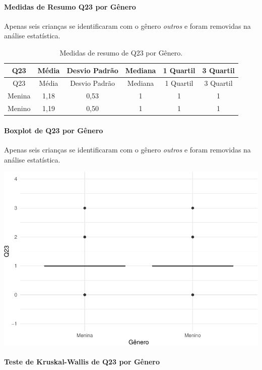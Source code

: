 \documentclass[]{article}
\let\oldparagraph\paragraph
\renewcommand{\paragraph}[1]{\oldparagraph{#1}\mbox{}}
\begin{document}
\hypertarget{medidas-de-resumo-q23-por-guxeanero}{%
\paragraph{Medidas de Resumo Q23 por Gênero}\label{medidas-de-resumo-q23-por-guxeanero}}

Apenas seis crianças se identificaram com o gênero \emph{outros} e foram removidas na análise estatística.

\begin{longtable}[]{@{}cccccc@{}}
\caption{\label{tab:unnamed-chunk-558}Medidas de resumo de Q23 por Gênero.}\tabularnewline
\toprule
Q23 & Média & Desvio Padrão & Mediana & 1 Quartil & 3 Quartil\tabularnewline
\midrule
\endfirsthead
\toprule
Q23 & Média & Desvio Padrão & Mediana & 1 Quartil & 3 Quartil\tabularnewline
\midrule
\endhead
Menina & 1,18 & 0,53 & 1 & 1 & 1\tabularnewline
Menino & 1,19 & 0,50 & 1 & 1 & 1\tabularnewline
\bottomrule
\end{longtable}

\hypertarget{boxplot-de-q23-por-guxeanero}{%
\paragraph{Boxplot de Q23 por Gênero}\label{boxplot-de-q23-por-guxeanero}}

Apenas seis crianças se identificaram com o gênero \emph{outros} e foram removidas na análise estatística.

\begin{center}\includegraphics[width=0.75\linewidth]{relatorio_covid19_files/figure-latex/unnamed-chunk-559-1} \end{center}

\hypertarget{teste-de-kruskal-wallis-de-q23-por-guxeanero}{%
\paragraph{Teste de Kruskal-Wallis de Q23 por Gênero}\label{teste-de-kruskal-wallis-de-q23-por-guxeanero}}
\end{document}
